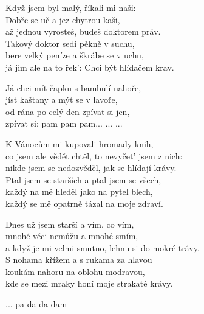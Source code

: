 \ve{}
Když jsem byl malý, říkali mi naši: \\
Dobře se uč a jez chytrou kaši, \\
až jednou vyrosteš, budeš doktorem práv.\\
Takový doktor sedí pěkně v suchu, \\
bere velký peníze a škrábe se v uchu,\\
já jim ale na to řek': Chci být hlídačem krav.

\cho{}
Já chci mít čapku s bambulí nahoře, \\
jíst kaštany a mýt se v lavoře, \\
od rána po celý den zpívat si jen, \\
zpívat si: pam pam pam... ... ...

\ve{}
K Vánocům mi kupovali hromady knih, \\
co jsem ale vědět chtěl, to nevyčet' jsem z nich: \\
nikde jsem se nedozvěděl, jak se hlídají krávy. \\
Ptal jsem se starších a ptal jsem se všech, \\
každý na mě hleděl jako na pytel blech, \\
každý se mě opatrně tázal na moje zdraví. 

\cho{}

\ve{}
Dnes už jsem starší a vím, co vím, \\
mnohé věci nemůžu a mnohé smím, \\
a když je mi velmi smutno, lehnu si do mokré trávy. \\
S nohama křížem a s rukama za hlavou \\
koukám nahoru na oblohu modravou, \\
kde se mezi mraky honí moje strakaté krávy. 

\ch{}
... pa da da dam

\esong{}
